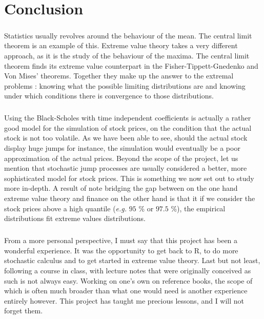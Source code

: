 \chapter{Conclusion}
\paragraph{}
Statistics usually revolves around the behaviour of the mean. The central limit theorem is an example of this. Extreme value theory takes a very different approach, as it is the study of the behaviour of the maxima. The central limit theorem finds its extreme value counterpart in the Fisher-Tippett-Gnedenko and Von Mises' theorems. Together they make up the answer to the extremal problems : knowing what the possible limiting distributions are and knowing under which conditions there is convergence to those distributions.
\paragraph{}
Using the Black-Scholes with time independent coefficients is actually a rather good model for the simulation of stock prices, on the condition that the actual stock is not too volatile. As we have been able to see, should the actual stock display huge jumps for instance, the simulation would eventually be a poor approximation of the actual prices. Beyond the scope of the project, let us mention that stochastic jump processes are usually considered a better, more sophisticated model for stock prices. This is something we now set out to study more in-depth.\newline
A result of note bridging the gap between on the one hand extreme value theory and finance on the other hand is that it if we consider the stock prices above a high quantile (\textit{e.g.} $95$ \% or $97.5$ \%), the empirical distributions fit extreme values distributions.

\bigskip
\paragraph{}
From a more personal perspective, I must say that this project has been a wonderful experience. It was the opportunity to get back to R, to do more stochastic calculus and to get started in extreme value theory. Last but not least, following a course in class, with lecture notes that were originally conceived as such is not always easy. Working on one's own on reference books, the scope of which is often much broader than what one would need is another experience entirely however. This project has taught me precious lessons, and I will not forget them.